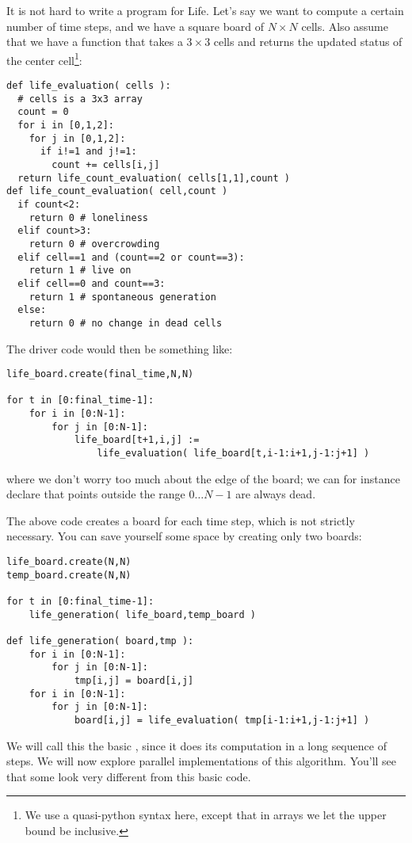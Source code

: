 It is not hard to write a program for Life. Let's say we want to compute a certain
number of time steps, and we have a square board of $N\times N$ cells.
Also assume that we have a function  that takes a
$3\times3$ cells and returns the updated status of the center cell\footnote{We
use a quasi-python syntax here, except that in arrays we let the upper bound 
be inclusive.}:
\begin{verbatim}
def life_evaluation( cells ):
  # cells is a 3x3 array
  count = 0
  for i in [0,1,2]:
    for j in [0,1,2]:
      if i!=1 and j!=1:
        count += cells[i,j]
  return life_count_evaluation( cells[1,1],count )
def life_count_evaluation( cell,count )
  if count<2:
    return 0 # loneliness
  elif count>3:
    return 0 # overcrowding
  elif cell==1 and (count==2 or count==3):
    return 1 # live on
  elif cell==0 and count==3:
    return 1 # spontaneous generation
  else:
    return 0 # no change in dead cells
\end{verbatim}

The driver code would then be something like:
\begin{verbatim}
life_board.create(final_time,N,N)

for t in [0:final_time-1]:
    for i in [0:N-1]:
        for j in [0:N-1]:
            life_board[t+1,i,j] := 
                life_evaluation( life_board[t,i-1:i+1,j-1:j+1] )
\end{verbatim}
where we don't worry too much about the edge of the board;
we can for instance declare that points outside the range $0\ldots N-1$ 
are always dead.

The above code creates a board for each time step, which
is not strictly necessary. You can save yourself some space
by creating only two boards:
\begin{verbatim}
life_board.create(N,N)
temp_board.create(N,N)

for t in [0:final_time-1]:
    life_generation( life_board,temp_board )

def life_generation( board,tmp ):
    for i in [0:N-1]:
        for j in [0:N-1]:
            tmp[i,j] = board[i,j]
    for i in [0:N-1]:
        for j in [0:N-1]:
            board[i,j] = life_evaluation( tmp[i-1:i+1,j-1:j+1] )
\end{verbatim}
We will call this the basic , since it does
its computation in a long sequence of steps. We will now explore parallel
implementations of this algorithm. You'll see that some look very different 
from this basic code.

